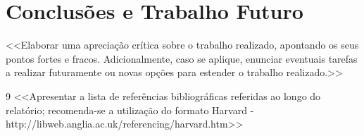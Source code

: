 \documentclass[a4paper,12pt]{scrreprt}
\begin{document}

\chapter{Conclusões e Trabalho Futuro}
    <<Elaborar uma apreciação crítica sobre o trabalho realizado, apontando os seus pontos fortes e fracos. Adicionalmente, caso se aplique, enunciar eventuais tarefas a realizar futuramente ou novas opções para estender o trabalho realizado.>>





\renewcommand{\nomname}{Lista de Siglas e Acrónimos}

\renewcommand{\nompreamble}{Apresentar uma lista com todas as siglas e acrónimos utilizados...}


\printnomenclature



\renewcommand\bibname{Referências}

\begin{thebibliography}{9}
<<Apresentar a lista de referências bibliográficas referidas ao longo do relatório; recomenda-se a utilização do formato Harvard - http://libweb.anglia.ac.uk/referencing/harvard.htm>>
\end{thebibliography}
\end{document}
